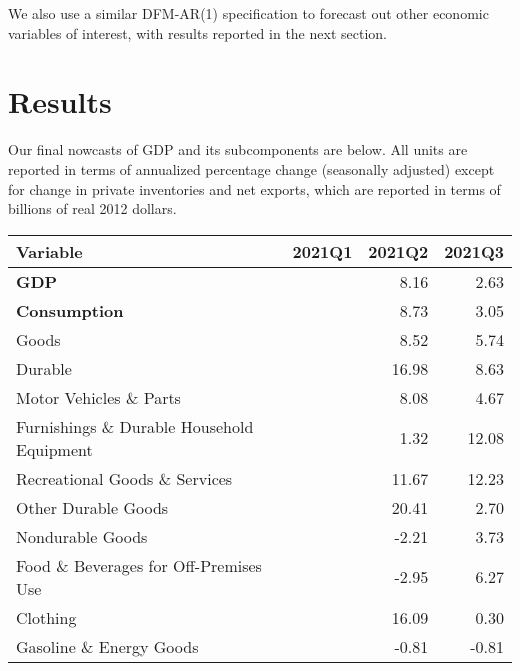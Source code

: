 \documentclass[11pt, letterpaper]{article}\usepackage[]{graphicx}\usepackage[]{color}
\begin{document}
We also use a similar DFM-AR(1) specification to forecast out other economic variables of interest, with results reported in the next section.


\section{Results}
Our final nowcasts of GDP and its subcomponents are below. All units are reported in terms of annualized percentage change (seasonally adjusted) except for change in private inventories and net exports, which are reported in terms of billions of real 2012 dollars.
\begin{table}[H]
\centering
\begingroup\fontsize{10pt}{12pt}\selectfont
\begin{tabular}{lrrr}
  \hline
Variable & 2021Q1 & 2021Q2 & 2021Q3 \\ 
  \hline
\hspace{0mm} \textbf{GDP} &  & 8.16 & 2.63 \\ 
  \hspace{0mm} \textbf{Consumption} &  & 8.73 & 3.05 \\ 
  \hspace{8mm}  Goods &  & 8.52 & 5.74 \\ 
  \hspace{16mm}  Durable &  & 16.98 & 8.63 \\ 
  \hspace{24mm}  Motor Vehicles \& Parts &  & 8.08 & 4.67 \\ 
  \hspace{24mm}  Furnishings \& Durable Household Equipment &  & 1.32 & 12.08 \\ 
  \hspace{24mm}  Recreational Goods \& Services &  & 11.67 & 12.23 \\ 
  \hspace{24mm}  Other Durable Goods &  & 20.41 & 2.70 \\ 
  \hspace{16mm}  Nondurable Goods &  & -2.21 & 3.73 \\ 
  \hspace{24mm}  Food \& Beverages for Off-Premises Use &  & -2.95 & 6.27 \\ 
  \hspace{24mm}  Clothing &  & 16.09 & 0.30 \\ 
  \hspace{24mm}  Gasoline \& Energy Goods &  & -0.81 & -0.81 \\ 

\end{tabular}
\end{table}
\end{document}
